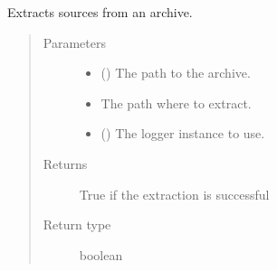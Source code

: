 \documentclass[a4paper,10pt,english]{sphinxmanual}
\begin{document}
\begin{fulllineitems}
\label{\detokenize{commands/apidoc/src:src.system.archive_extract}}
Extracts sources from an archive.
\begin{quote}\begin{description}
\item[{Parameters}] \leavevmode\begin{itemize}
\item {} 
 () \textendash{} The path to the archive.

\item {} 
 \textendash{} The path where to extract.

\item {} 
 () \textendash{} The logger instance to use.

\end{itemize}

\item[{Returns}] \leavevmode
True if the extraction is successful

\item[{Return type}] \leavevmode
boolean

\end{description}\end{quote}

\end{fulllineitems}

\end{document}

